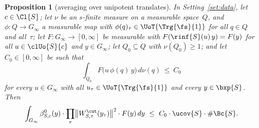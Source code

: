 \documentclass[11pt,a4paper]{article}
\newcommand{\m}[1]{\mbox{$#1$}}        %
\theoremstyle{plainx}
\newtheorem{proposition}[theorem]{Proposition}
\theoremstyle{uprightx}
\renewcommand{\m}[1]{$#1$}
\newcommand{\nuS}{\ucov{S}}
\newcommand{\ri}[1]{\rinf{S}(#1)}
\newcommand{\Ginf}{G_{\infty}}
\newcommand{\Tone}{\Trg{\fs}{1}}
\newcommand{\Uoone}{\UoT{\Tone}}
\newcommand{\Wt}[3]{W^{#1}_{#2,#3}}
\begin{document}
\begin{proposition}[averaging over unipotent translates]\label{p:avg}
In Setting~\ref{set:data}, let \m{c\in\Cl{S}}; let $\nu$ be an $s$-finite measure on a measurable space~$Q$, and
\m{\phi\colon Q\to\Ginf} a measurable map with \m{\phi(q)_\tau\in\Uoone} for all \m{q\in Q} and all~$\tau$; let
\m{F\colon\Ginf\to[0,\infty]} be measurable with \m{F(\ri{u}\,y)=F(y)} for all \m{u\in\clUo{S}{c}} and
\m{y\in\Ginf}; let \m{Q_0\subseteq Q} with \m{\nu(Q_0)\ge1}; and let \m{C_0\in[0,\infty]} be such that
\[\int_{Q_0}F\bigl(u\,\phi(q)\,y\bigr)\,d\nu(q)\ \le\ C_0\]
for every \m{u\in\Ginf} with all \m{u_\tau\in\Uoone} and every \m{y\in\bxp{S}}. Then
\[\int_{\Ginf}\bcut{S}{c}(y)\cdot\prod_\tau\bigl\|\Wt{\cut}{S}{\tau}(y_\tau)\bigr\|^{2}\cdot F(y)\,dy\ \le\
C_0\cdot\nuS\cdot\#\Bc{S}.\]
\end{proposition}
\end{document}
